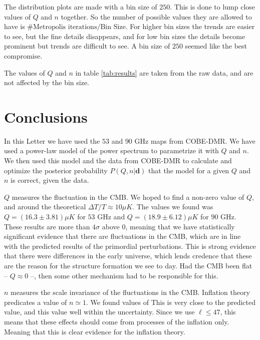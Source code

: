 \documentclass{emulateapj}
\begin{document}
The distribution plots are made with a bin size of $250$. This is done to lump close values of $Q$ and $n$ together. So the number of possible values they are allowed to have is $\#\text{Metropolis iterations}/\text{Bin Size}$. For higher bin sizes the trends are easier to see, but the fine details disappears, and for low bin sizes the details become prominent but trends are difficult to see. A bin size of $250$ seemed like the best compromise. 

The values of $Q$ and $n$ in table \ref{tab:results} are taken from the raw data, and are not affected by the bin size.











\section{Conclusions}
\label{sec:conclusions}

In this Letter we have used the $53$ and $90$ GHz maps from COBE-DMR. We have used a power-law model of the power spectrum to parametrize it with $Q$ and $n$. We then used this model and the data from COBE-DMR to calculate and optimize the posterior probability $P(Q,n|\mathbf{d})$ that the model for a given $Q$ and $n$ is correct, given the data.


$Q$ measures the fluctuation in the CMB. We hoped to find a non-zero value of $Q$, and around the theoretical $\Delta T/T \approx 10 \mu K$. The values we found was $Q = (16.3 \pm 3.81)\mu K$ for $53$ GHz and $Q = (18.9 \pm 6.12)\mu K$ for $90$ GHz. These results are more than $4\sigma$ above 0, meaning that we have statistically significant evidence that there are fluctuations in the CMB, which are in line with the predicted results of the primordial perturbations. This is strong evidence that there were differences in the early universe, which lends credence that these are the reason for the structure formation we see to day. Had the CMB been flat -- $Q \approx 0$ --, then some other mechanism had to be responsible for this.

$n$ measures the scale invariance of the fluctuations in the CMB. Inflation theory predicates a value of $n\simeq 1$. We found values of 	 This is very close to the predicted value, and this value well within the uncertainty. Since we use $\ell \leq 47$, this means that these effects should come from processes of the inflation only. Meaning that this is clear evidence for the inflation theory. 
\end{document}
